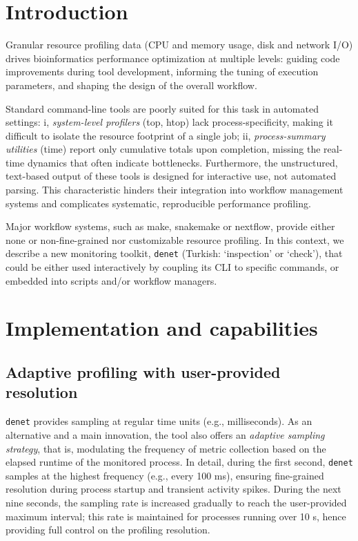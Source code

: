 \documentclass[10pt]{article}
\renewcommand{\label}[1]{\gdef\labelname{##1}}%
\begin{document}
\section*{Introduction}  %
\label{sec:intro}

Granular resource profiling data (CPU and memory usage, disk and network I/O)  drives bioinformatics performance optimization at multiple levels: guiding code improvements during tool development, informing the tuning of execution parameters, and shaping the design of the overall workflow.

Standard command-line tools are poorly suited for this task in automated settings: i, \emph{system-level profilers} (top, htop) lack process-specificity, making it difficult to isolate the resource footprint of a single job; ii, \emph{process-summary utilities} (time) report only cumulative totals upon completion, missing the real-time dynamics that often indicate bottlenecks. Furthermore, the unstructured, text-based output of these tools is designed for interactive use, not automated parsing. This characteristic hinders their integration into workflow management systems and complicates systematic, reproducible performance profiling.

Major workflow systems, such as make, snakemake or nextflow, provide either none or non-fine-grained nor customizable resource profiling. In this context, we describe a new monitoring toolkit, \texttt{denet} (Turkish: `inspection' or `check'), that could be either used interactively by coupling its CLI to specific commands, or embedded into scripts and/or workflow managers.

\section*{Implementation and capabilities}

\subsection*{Adaptive profiling with user-provided resolution}

\texttt{denet} provides sampling at regular time units (e.g., milliseconds). As an alternative and a main innovation, the tool also offers an \emph{adaptive sampling strategy}, that is, modulating the frequency of metric collection based on the elapsed runtime of the monitored process. In detail, during the first second, \texttt{denet} samples at the highest frequency (e.g., every 100 ms), ensuring fine-grained resolution during process startup and transient activity spikes. During the next nine seconds, the sampling rate is increased gradually to reach the user-provided maximum interval; this rate is maintained for processes running over 10 s, hence providing full control on the profiling resolution.
\end{document}
